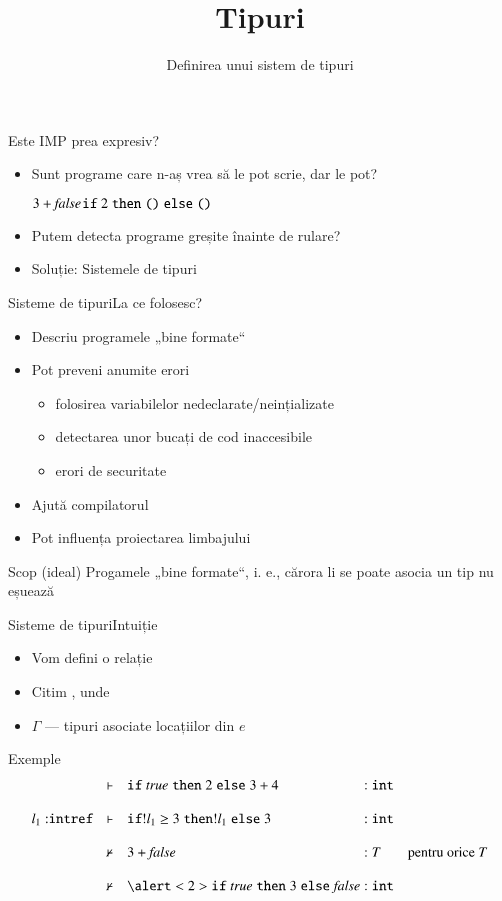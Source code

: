 \documentclass[xcolor=pdftex,romanian,colorlinks]{beamer}
\title[SLP---Tipuri]{Tipuri}
\subtitle{Definirea unui sistem de tipuri}
\begin{document}
\begin{frame}
  \titlepage
\end{frame}

\begin{frame}{Este IMP prea expresiv?}
\begin{itemize}
\item Sunt programe care n-aș vrea să le pot scrie, dar le pot?

\hfill $3 + {\it false}$\hfill $\mathrel{\text{\ttfamily if}} 2 \mathrel{\text{\ttfamily then}} {\mathrel{\text{\ttfamily ()}}} \mathrel{\text{\ttfamily else}} {\mathrel{\text{\ttfamily ()}}}$\hfill\;
\item Putem detecta programe greșite înainte de rulare?
\item Soluție: Sistemele de tipuri
\end{itemize}
\end{frame}

\begin{frame}{Sisteme de tipuri}{La ce folosesc?}

\begin{itemize}
\item Descriu programele „bine formate“
\item Pot preveni anumite erori
\begin{itemize}
\item folosirea variabilelor nedeclarate/neințializate
\item detectarea unor bucați de cod inaccesibile
\item erori de securitate
\end{itemize}
\item Ajută compilatorul 
\item Pot influența proiectarea limbajului
\end{itemize}
\vfill
\begin{block}{Scop (ideal)}
Progamele „bine formate“, i. e., cărora li se poate asocia un tip nu eșuează
\end{block}
\end{frame}

\begin{frame}{Sisteme de tipuri}{Intuiție}
\begin{itemize}
\item Vom defini o relație 
\item Citim , unde
\item $\Gamma$ — tipuri asociate locațiilor din $e$
\end{itemize}

\begin{block}{Exemple}
\[\begin{array}{lll@{\;:\;}ll}
&\vdash& \Sif {\Strue} \Sthen 2 \Selse 3+4 & \Sint 
\\\\
l_1:\Sintref&\vdash&\Sif !l_1 \geq 3 \Sthen !l_1 \Selse 3& \Sint 
\\\\
&\not\vdash&3 + {\Sfalse}&T&\mbox{pentru orice } T
\\\\
&\not\vdash&\alert<2>{\Sif {\Strue} \Sthen 3 \Selse {\Sfalse}} & \Sint
\end{array}\]
\end{block}
\end{frame}
\end{document}

